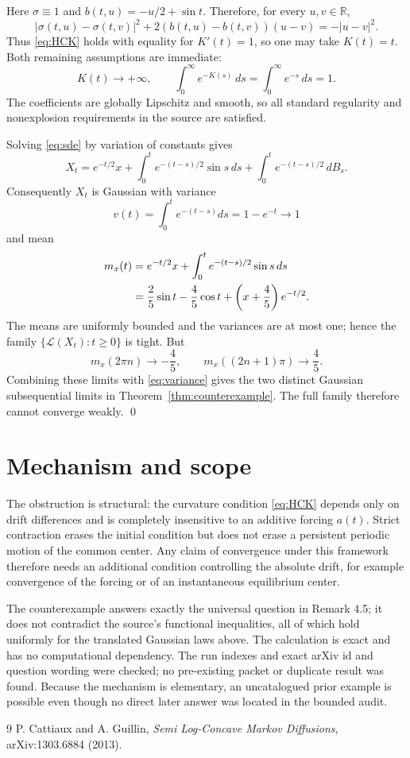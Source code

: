 \documentclass[11pt]{article}
\newcommand{\R}{\mathbb R}
\begin{document}
Here $\sigma\equiv1$ and $b(t,u)=-u/2+\sin t$.  Therefore, for every
$u,v\in\R$,
\[
 |\sigma(t,u)-\sigma(t,v)|^2
 +2(b(t,u)-b(t,v))(u-v)=-|u-v|^2.
\]
Thus \eqref{eq:HCK} holds with equality for $K'(t)=1$, so one may take
$K(t)=t$.  Both remaining assumptions are immediate:
\[
 K(t)\longrightarrow+\infty,
 \qquad
 \int_0^\infty e^{-K(s)}\,ds=\int_0^\infty e^{-s}\,ds=1.
\]
The coefficients are globally Lipschitz and smooth, so all standard
regularity and nonexplosion requirements in the source are satisfied.

Solving \eqref{eq:sde} by variation of constants gives
\[
 X_t=e^{-t/2}x+\int_0^t e^{-(t-s)/2}\sin s\,ds
                 +\int_0^t e^{-(t-s)/2}\,dB_s.
\]
Consequently $X_t$ is Gaussian with variance
\begin{equation}\label{eq:variance}
 v(t)=\int_0^t e^{-(t-s)}ds=1-e^{-t}\longrightarrow1
\end{equation}
and mean
\begin{align}\label{eq:mean}
 m_x(t)
 &=e^{-t/2}x+\int_0^t e^{-(t-s)/2}\sin s\,ds\notag\\
 &=\frac25\sin t-\frac45\cos t+\left(x+\frac45\right)e^{-t/2}.
\end{align}
The means are uniformly bounded and the variances are at most one; hence the
family $\{\mathcal L(X_t):t\ge0\}$ is tight.  But
\[
 m_x(2\pi n)\longrightarrow-\frac45,
 \qquad
 m_x((2n+1)\pi)\longrightarrow\frac45.
\]
Combining these limits with \eqref{eq:variance} gives the two distinct
Gaussian subsequential limits in Theorem~\ref{thm:counterexample}.  The full
family therefore cannot converge weakly. \qed

\section{Mechanism and scope}

The obstruction is structural: the curvature condition \eqref{eq:HCK}
depends only on drift differences and is completely insensitive to an
additive forcing $a(t)$.  Strict contraction erases the initial condition but
does not erase a persistent periodic motion of the common center.  Any claim
of convergence under this framework therefore needs an additional condition
controlling the absolute drift, for example convergence of the forcing or of
an instantaneous equilibrium center.

The counterexample answers exactly the universal question in Remark 4.5; it
does not contradict the source's functional inequalities, all of which hold
uniformly for the translated Gaussian laws above.  The calculation is exact
and has no computational dependency.  The run indexes and exact arXiv id and
question wording were checked; no pre-existing packet or duplicate result was
found.  Because the mechanism is elementary, an uncatalogued prior example is
possible even though no direct later answer was located in the bounded audit.

\begin{thebibliography}{9}
P. Cattiaux and A. Guillin,
\emph{Semi Log-Concave Markov Diffusions},
arXiv:1303.6884 (2013).
\end{thebibliography}
\end{document}
